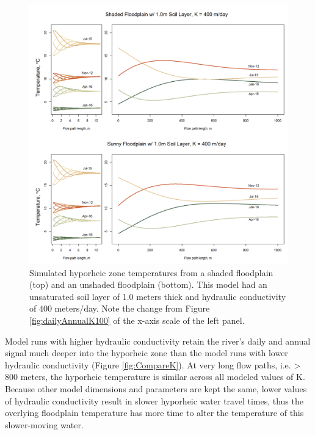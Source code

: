 \documentclass[letterpaper, 11pt]{article}
\begin{document}
\begin{figure}
    \centering
    \includegraphics{Figures/shaded_and_sunny_1.0_daily_with_annual_k400.png}
    \caption{Simulated hyporheic zone temperatures from a shaded floodplain (top) and an unshaded floodplain (bottom). This model had an unsaturated soil layer of 1.0 meters thick and hydraulic conductivity of 400 meters/day. Note the change from Figure \ref{fig:dailyAnnualK100} of the x-axis scale of the left panel.}
    \label{fig:dailyAnnualK400}
\end{figure}

Model runs with higher hydraulic conductivity retain the river’s daily and annual signal much deeper into the hyporheic zone than the model runs with lower hydraulic conductivity (Figure \ref{fig:CompareK}). At very long flow paths, i.e. > 800 meters, the hyporheic temperature is similar across all modeled values of K. Because other model dimensions and parameters are kept the same, lower values of hydraulic conductivity result in slower hyporheic water travel times, thus the overlying floodplain temperature has more time to alter the temperature of this slower-moving water. 
\end{document}
